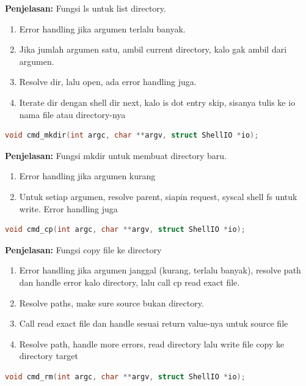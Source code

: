 \textbf{Penjelasan:} Fungsi ls untuk list directory.

\begin{enumerate}
    \item Error handling jika argumen terlalu banyak.
    \item Jika jumlah argumen satu, ambil current directory, kalo gak ambil dari argumen.
    \item Resolve dir, lalu open, ada error handling juga.
    \item Iterate dir dengan shell dir next, kalo is dot entry skip, sisanya tulis ke io nama file atau directory-nya
\end{enumerate}

\begin{lstlisting}[language=c]
    void cmd_mkdir(int argc, char **argv, struct ShellIO *io);
\end{lstlisting}

\textbf{Penjelasan:} Fungsi mkdir untuk membuat directory baru.

\begin{enumerate}
    \item Error handling jika argumen kurang
    \item Untuk setiap argumen, resolve parent, siapin request, syscal shell fs untuk write. Error handling juga
\end{enumerate}

\begin{lstlisting}[language=c]
    void cmd_cp(int argc, char **argv, struct ShellIO *io);
\end{lstlisting}

\textbf{Penjelasan:} Fungsi copy file ke directory

\begin{enumerate}
    \item Error handling jika argumen janggal (kurang, terlalu banyak), resolve path dan handle error kalo directory, lalu call cp read exact file.
    \item Resolve paths, make sure source bukan directory.
    \item Call read exact file dan handle sesuai return value-nya untuk source file
    \item Resolve path, handle more errors, read directory lalu write file copy ke directory target
\end{enumerate}

\begin{lstlisting}[language=c]
    void cmd_rm(int argc, char **argv, struct ShellIO *io);
\end{lstlisting}

